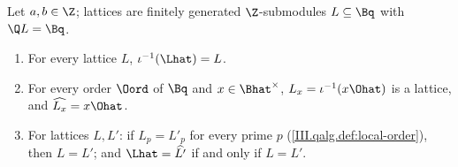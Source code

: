 Let $a,b\in\Z$; lattices are finitely generated $\Z$-submodules $L\subseteq\Bq$ with $\Q L=\Bq$.
\begin{enumerate}[label=(\alph*)]
\item For every lattice $L$, $\iota^{-1}(\Lhat)=L$.
\item For every order $\Oord$ of $\Bq$ and $x\in\Bhat^\times$, $L_x=\iota^{-1}(x\Ohat)$ is a lattice, and $\widehat{L_x}=x\Ohat$.
\item For lattices $L,L'$: if $L_p=L'_p$ for every prime $p$ (\cref{III.qalg.def:local-order}), then $L=L'$; and $\Lhat=\widehat{L'}$ if and only if
  $L=L'$.
\end{enumerate}
